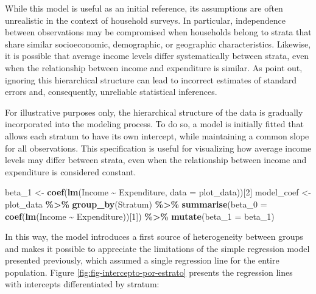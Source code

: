 \documentclass[
  english,
  12pt,
]{book}
\newenvironment{Shaded}{\begin{snugshade}}{\end{snugshade}}
\newcommand{\AttributeTok}[1]{\textcolor[rgb]{0.13,0.29,0.53}{#1}}
\newcommand{\DecValTok}[1]{\textcolor[rgb]{0.00,0.00,0.81}{#1}}
\newcommand{\FunctionTok}[1]{\textcolor[rgb]{0.13,0.29,0.53}{\textbf{#1}}}
\newcommand{\NormalTok}[1]{#1}
\newcommand{\OtherTok}[1]{\textcolor[rgb]{0.56,0.35,0.01}{#1}}
\newcommand{\SpecialCharTok}[1]{\textcolor[rgb]{0.81,0.36,0.00}{\textbf{#1}}}
\begin{document}
While this model is useful as an initial reference, its assumptions are often unrealistic in the context of household surveys. In particular, independence between observations may be compromised when households belong to strata that share similar socioeconomic, demographic, or geographic characteristics. Likewise, it is possible that average income levels differ systematically between strata, even when the relationship between income and expenditure is similar. As \citet{finch2019multilevel} point out, ignoring this hierarchical structure can lead to incorrect estimates of standard errors and, consequently, unreliable statistical inferences.

For illustrative purposes only, the hierarchical structure of the data is gradually incorporated into the modeling process. To do so, a model is initially fitted that allows each stratum to have its own intercept, while maintaining a common slope for all observations. This specification is useful for visualizing how average income levels may differ between strata, even when the relationship between income and expenditure is considered constant.

\begin{Shaded}
\begin{Highlighting}[]
\NormalTok{beta\_1 }\OtherTok{\textless{}{-}} \FunctionTok{coef}\NormalTok{(}\FunctionTok{lm}\NormalTok{(Income }\SpecialCharTok{\textasciitilde{}}\NormalTok{ Expenditure, }\AttributeTok{data =}\NormalTok{ plot\_data))[}\DecValTok{2}\NormalTok{]}
\NormalTok{model\_coef }\OtherTok{\textless{}{-}}\NormalTok{ plot\_data }\SpecialCharTok{\%\textgreater{}\%}
  \FunctionTok{group\_by}\NormalTok{(Stratum) }\SpecialCharTok{\%\textgreater{}\%}
  \FunctionTok{summarise}\NormalTok{(}\AttributeTok{beta\_0 =} \FunctionTok{coef}\NormalTok{(}\FunctionTok{lm}\NormalTok{(Income }\SpecialCharTok{\textasciitilde{}}\NormalTok{ Expenditure))[}\DecValTok{1}\NormalTok{]) }\SpecialCharTok{\%\textgreater{}\%}
  \FunctionTok{mutate}\NormalTok{(}\AttributeTok{beta\_1 =}\NormalTok{ beta\_1)}
\end{Highlighting}
\end{Shaded}

In this way, the model introduces a first source of heterogeneity between groups and makes it possible to appreciate the limitations of the simple regression model presented previously, which assumed a single regression line for the entire population. Figure \ref{fig:fig-intercepto-por-estrato} presents the regression lines with intercepts differentiated by stratum:
\end{document}
